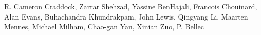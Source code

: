 R. Cameron Craddock, Zarrar Shehzad, Yassine BenHajali, Francois Chouinard, Alan Evans, Buhachandra Khundrakpam, John Lewis, Qingyang Li, Maarten Mennes, Michael Milham, Chao-gan Yan, Xinian Zuo, P. Bellec

